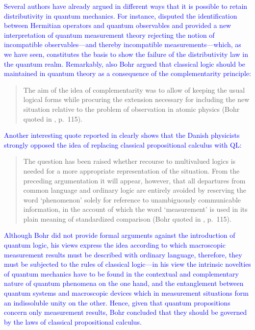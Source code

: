 \documentclass[11pt, executivepaper]{article}
\begin{document}
\textcolor{blue}{Several authors have already argued in different ways that it is possible to retain distributivity in quantum mechanics. For instance, \cite{Park:1968} disputed the identification between Hermitian operators and quantum observables and provided a new interpretation of quantum measurement theory rejecting the notion of incompatible observables---and thereby incompatible measurements---which, as we have seen, constitutes the basis to show the failure of the distributivity law in the quantum realm. Remarkably, also Bohr argued that classical logic should be maintained in quantum theory as a consequence of the complementarity principle:
\begin{quote}
The aim of the idea of complementarity was to allow of keeping the usual logical forms while procuring the extension necessary for including the new situation relative to the problem of observation in atomic physics (Bohr quoted in \cite{Faye:2021}, p.\ 115).
\end{quote}
Another interesting quote reported in \cite{Faye:2021} clearly shows that the Danish physicists strongly opposed the idea of replacing classical propositional calculus with QL: 
\begin{quote}
The question has been raised whether recourse to multivalued logics is needed for a more appropriate representation of the situation. From the preceding argumentation it will appear, however, that all departures from common language and ordinary logic are entirely avoided by reserving the word `phenomenon' solely for reference to unambiguously communicable information, in the account of which the word `measurement' is used in its plain meaning of standardized comparison (Bohr quoted in \cite{Faye:2021}, p.\ 115).
\end{quote}
Although Bohr did not provide formal arguments against the introduction of quantum logic, his views express the idea according to which macroscopic measurement results must be described with ordinary language, therefore, they must be subjected to the rules of classical logic---in his view the intrinsic novelties of quantum mechanics have to be found in the contextual and complementary nature of quantum phenomena on the one hand, and the entanglement between quantum systems and macroscopic devices which in measurement situations form an indissoluble unity on the other. Hence, given that quantum propositions concern only measurement results, Bohr concluded that they should be governed by the laws of classical propositional calculus.
}
\end{document}
